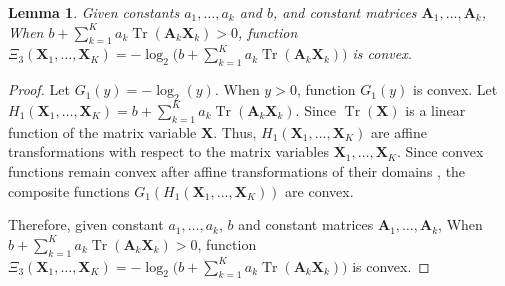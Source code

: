\documentclass[10pt,journal,compsoc]{IEEEtran}
\newtheorem{lemma}{\textbf{Lemma}}
\newtheorem*{proof}{Proof}
\begin{document}
\begin{lemma}\label{lemma:Prove-Convex-3}
    Given constants $a_{1}, \dots, a_{k}$ and $b$, and constant matrices $\mathbf{A}_{1}, \dots, \mathbf{A}_{k}$,
    When $b + \sum_{k =  1}^{K} a_{k}\operatorname{Tr}\left(\mathbf{A}_{k}\mathbf{X}_{k}\right) > 0$, function $\Xi_{3}(\mathbf{X}_{1}, \dots, \mathbf{X}_{K}) = -\log_2 \Big(b + \sum_{k =  1}^{K} a_{k}\operatorname{Tr}\left(\mathbf{A}_{k}\mathbf{X}_{k}\right)\Big)$ is convex.
\end{lemma}
\begin{proof}
    Let $G_{1}(y) = -\log_2 \left(y\right)$.
    When $y > 0$, function $G_{1}(y)$ is convex. 
    Let $H_{1}\left(\mathbf{X}_{1}, \dots, \mathbf{X}_{K}\right) = b + \sum_{k =  1}^{K} a_{k}\operatorname{Tr}\left(\mathbf{A}_{k}\mathbf{X}_{k}\right)$.
    Since $\operatorname{Tr}\left(\mathbf{X}\right)$ is a linear function of the matrix variable $\mathbf{X}$\cite{Solution: Convex-Optimization-Book}.
    Thus, $H_{1}\left(\mathbf{X}_{1}, \dots, \mathbf{X}_{K}\right)$ are affine transformations with respect to the matrix variables $\mathbf{X}_{1}, \dots, \mathbf{X}_{K}$. 
    Since convex functions remain convex after affine transformations of their domains \cite {Solution: Convex-Optimization-Book}, the composite functions $G_{1}(H_{1}(\mathbf{X}_{1}, \dots, \mathbf{X}_{K}))$ are convex.

    Therefore, given constant $a_{1}, \dots, a_{k}$, $b$ and constant matrices $\mathbf{A}_{1}, \dots, \mathbf{A}_{k}$,
    When $b + \sum_{k =  1}^{K} a_{k}\operatorname{Tr}\left(\mathbf{A}_{k}\mathbf{X}_{k}\right) > 0$, function $\Xi_{3}(\mathbf{X}_{1}, \dots, \mathbf{X}_{K}) = -\log_2 \Big(b + \sum_{k =  1}^{K} a_{k}\operatorname{Tr}\left(\mathbf{A}_{k}\mathbf{X}_{k}\right)\Big)$ is convex.
\end{proof}
\end{document}
